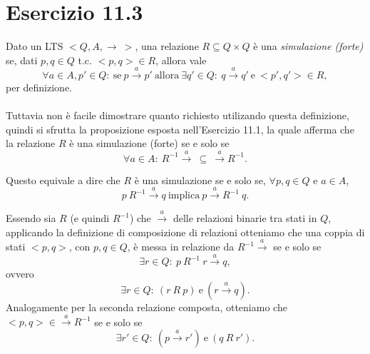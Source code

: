 \section*{Esercizio 11.3}

    
    Dato un LTS $<Q,A,\rightarrow\ >$, una relazione $R \subseteq Q \times Q$ è una \textit{simulazione (forte)} se, dati $p,q\in Q$ t.c. $<p,q>\in R$, allora vale
    \begin{equation*}
        \forall a\in A, p' \in Q:\ \mbox{se}\ p\xrightarrow{a}p'\ \mbox{allora}\ \exists q'\in Q:\ q\xrightarrow{a}q'\ \mbox{e}\ <p',q'>\in R,
    \end{equation*}
    per definizione.\\
    \\
    Tuttavia non è facile dimostrare quanto richiesto utilizando questa definizione, quindi si sfrutta la proposizione esposta nell'Esercizio 11.1, la quale afferma che la relazione $R$ è una simulazione (forte) se e solo se
    \begin{equation*}
        \forall a\in A:\ R^{-1}\xrightarrow{a} \ \subseteq \ \xrightarrow{a} R^{-1}.
    \end{equation*}
    
    Questo equivale a dire che $R$ è una simulazione se e solo se, $\forall p,q\in Q$ e $a\in A$,
    \begin{equation}
        p\ R^{-1} \xrightarrow{a} q \ \mbox{implica}\ p \xrightarrow{a} R^{-1}\ q.
        \label{eq:simulazione_alt}
    \end{equation}    
    
    Essendo sia $R$ (e quindi $R^{-1}$) che $\xrightarrow{a}$ delle relazioni binarie tra stati in $Q$, applicando la definizione di composizione di relazioni otteniamo che una coppia di stati $<p,q>$, con $p,q\in Q$, è messa in relazione da $R^{-1}\xrightarrow{a}$ se e solo se
    \begin{equation*}
        \exists r\in Q:\ p\ R^{-1}\ r \xrightarrow{a} q,
    \end{equation*}
    ovvero
    \begin{equation*}
        \exists r\in Q:\ (r\ R\ p)\ \mbox{e}\ (r \xrightarrow{a} q).
    \end{equation*}
    Analogamente per la seconda relazione composta, otteniamo che $<p,q>\in \xrightarrow{a}R^{-1}$ se e solo se
    \begin{equation*}
        \exists r'\in Q:\ (p \xrightarrow{a} r')\ \mbox{e}\ (q\ R\ r').
    \end{equation*}
    
